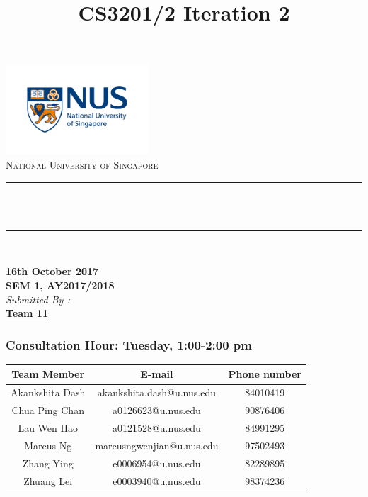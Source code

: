 \documentclass[12pt]{article}
\title{CS3201/2 Iteration 2}					%
\author{}
\makeatletter
\let\thetitle\@title
\makeatother
\begin{document}
\doublespacing


\begin{titlepage}
	\centering
    \includegraphics[width = 0.4\textwidth]{logo1.jpg}\\[0.4cm]	%
    \textsc{ National University of Singapore}\\[0.2 cm]	%
	\rule{\linewidth}{0.2 mm} \\[0.1 cm]
	{ \huge \bfseries \thetitle}\\
    \rule{\linewidth}{0.2 mm} \\[0.2 cm]
			\begin{center} 
            \textbf{16th October 2017}\\[0.7cm]
			\textbf { SEM 1, AY2017/2018}\\[0.7cm]
			\emph{Submitted By :} \\[0.1cm]
           
      \textbf{\underline{Team 11}}    
      \subsubsection*{Consultation Hour: Tuesday, 1:00-2:00 pm}
 \begin{table}[htbp]
\begin{tabular}{|c|c|c|}
\hline
\textbf{Team Member} & \textbf{E-mail} & \textbf{Phone number}\\\hline
Akankshita Dash & akankshita.dash@u.nus.edu & 84010419  \\
\hline
Chua Ping Chan & a0126623@u.nus.edu & 90876406 \\
\hline
Lau Wen Hao & a0121528@u.nus.edu & 84991295  \\
\hline
Marcus Ng & marcusngwenjian@u.nus.edu
 & 97502493  \\
\hline
Zhang Ying & e0006954@u.nus.edu
 & 82289895  \\
\hline
Zhuang Lei & e0003940@u.nus.edu
 & 98374236 \\
\hline
\end{tabular}
\end{table}
		    \end{center}
        


\end{titlepage}
\end{document}
